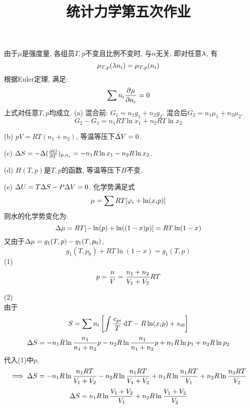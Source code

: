 \documentclass[UTF8,9pt]{ctexart}
\title{统计力学第五次作业}
\begin{document}
 
\maketitle
{}
由于$\mu$是强度量, 各组员$T,p$不变且比例不变时, 与$n$无关, 即对任意$\lambda$, 有
$$\mu_{T,p}(\lambda n_i) = \mu_{T,p}(n_i)$$
根据Euler定理, 满足:
$$\sum n_i\frac{\partial^{} \mu}{\partial {n_i}^{}}=0$$
上式对任意$T,p$均成立.
(a) 混合前: $G_1=n_1g_1+n_2g_2$. 混合后$G_2=n_1\mu_1+n_2\mu_2$.
$$G_2-G_1 = n_1RT\ln x_1+n_2RT\ln x_2$$

(b) $pV=RT(n_1+n_2)$, 等温等压下$\Delta V=0$.

(c) $\Delta S = -\Delta (\frac{\partial^{} G}{\partial {T}^{}})_{p,n_i}=-n_1R\ln x_1-n_2R\ln x_2$.

(d) $H (T,p)$是$T,p$的函数, 等温等压下$H$不变.

(e) $\Delta U =T\Delta S - P\Delta V=0$.
化学势满足式
$$\mu=\sum RT[\varphi_i+\ln(x_ip)]$$
则水的化学势变化为: 
$$\Delta \mu = RT[-\ln(p)+\ln((1-x)p)] = RT\ln(1-x)$$
又由于$\Delta\mu = g_1(T,p)-g_1(T,p_0)$, 
$$ g_1(T,p_0)+RT\ln(1-x)=g_1(T,p)$$
(1) 
$$p=\frac{n}{V}=\frac{n_1+n_2}{V_1+V_2}RT$$

(2)\\
由于
$$S=\sum n_i\left[\int\frac{c_{pi}}{T}\mathop{}\!\mathrm{d} T-R\ln(x_ip)+s_{i0}\right]$$
$$\Delta S= -n_1R\ln\frac{n_1}{n_1+n_2}p-n_2R\ln\frac{n_1}{n_1+n_2}p+n_1R\ln p_1+n_2R\ln p_2$$
代入(1)中$p$, 
$$\implies \Delta S= -n_1R\ln\frac{n_1RT}{V_1+V_2}-n_2R\ln\frac{n_1RT}{V_1+V_2}+n_1R\ln \frac{n_1RT}{V_1}+n_2R\ln \frac{n_2RT}{V_2}$$
$$\Delta S = n_1R\ln\frac{V_1+V_2}{V_1}+n_2R\ln\frac{V_1+V_2}{V_2}$$
\end{document}
